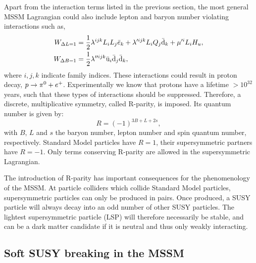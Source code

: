 Apart from the interaction terms listed in the previous section, the most general MSSM Lagrangian
could also include lepton and baryon number violating interactions such as, 
\begin{align}
  W_{\Delta L=1} &= \frac{1}{2} \lambda^{ijk} L_i L_j \bar{e}_k + \lambda'^{ijk} L_i Q_j
\bar{\mathrm{d}}_k + \mu'^{i} L_i H_u, \\
  W_{\Delta B=1} &= \frac{1}{2} \lambda''^{ijk} \bar{\mathrm{u}}_i \bar{\mathrm{d}}_j \bar{\mathrm{d}}_k, \\
\end{align}
where $i,j,k$ indicate family indices. 
These interactions could result in proton decay, ${p} \rightarrow \pi^0 + e^+$. Experimentally we
know that protons have a lifetime $>\text{10}^{\text{32}}$ years, such that these types of
interactions should be suppressed. 
Therefore, a discrete, multiplicative symmetry, called R-parity, is imposed. Its quantum number
is given by: 
\begin{equation}
  R = (-1)^{3B+L+2s} ,
\end{equation}
with $B$, $L$ and $s$ the baryon number, lepton number and spin quantum number, respectively. 
Standard Model particles have $R=1$, their supersymmetric partners have $R=-1$. Only
terms conserving R-parity are allowed in the supersymmetric Lagrangian. 

The introduction of R-parity has important consequences for the phenome\-nology of the MSSM.
At particle colliders which collide Standard Model particles, supersymmetric particles can only be
produced in pairs. Once produced, a SUSY particle will always decay into an odd number of other SUSY
particles. The lightest supersymmetric particle (LSP) will therefore necessarily be stable, and can
be a dark matter candidate if it is neutral and thus only weakly interacting. 


\subsection{Soft SUSY breaking in the MSSM}

